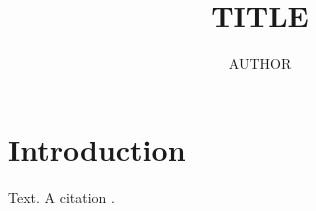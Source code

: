 \documentclass{tufte-book}
\title{{{TITLE}}}
\author{{{AUTHOR}}}
\begin{document}
\maketitle
\tableofcontents
\chapter{Introduction}
Text. A citation \cite{examplebook}.


\end{document}
